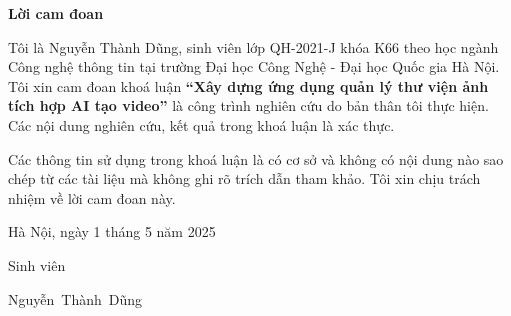 \setcounter{page}{1}
\begin{center}
	\textbf{\large{Lời cam đoan}	}
\end{center}
Tôi là Nguyễn Thành Dũng, sinh viên lớp QH-2021-J khóa K66 theo học ngành Công nghệ thông tin tại trường Đại học Công Nghệ - Đại học Quốc gia Hà Nội. Tôi xin cam đoan khoá luận \textbf{``Xây dựng ứng dụng quản lý thư viện ảnh tích hợp AI tạo video''} là công trình nghiên cứu do bản thân tôi thực hiện. Các nội dung nghiên cứu, kết quả trong khoá luận là xác thực.

Các thông tin sử dụng trong khoá luận là có cơ sở và không có nội dung nào sao chép từ các tài liệu mà không ghi rõ trích dẫn tham khảo. Tôi xin chịu trách nhiệm về lời cam đoan này.

\begin{flushright}
	Hà Nội, ngày 1 tháng 5 năm 2025
\end{flushright}

\begin{changemargin}{12cm}{2cm}
	Sinh viên
	\\[2cm]
\end{changemargin}

\begin{changemargin}{11cm}{2cm}
	\begin{center}
		Nguyễn~Thành~Dũng
	\end{center}
\end{changemargin}